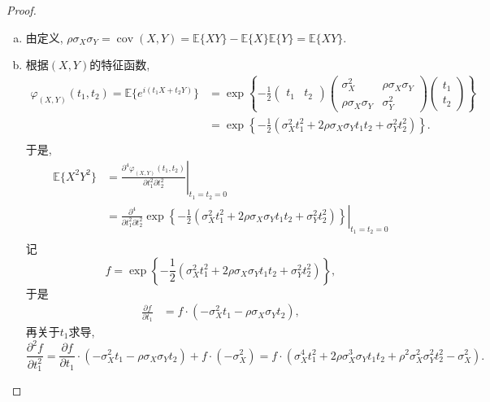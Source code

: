 \documentclass[UTF8, a4paper]{article}
\begin{document}
\begin{proof}
\begin{enumerate}[a)]
    \item 由定义, \(\rho \sigma_X \sigma_Y = \operatorname{cov}(X,Y) = \mathbb{E}\{XY\} - \mathbb{E}\{X\} \mathbb{E}\{Y\} = \mathbb{E}\{XY\}\).
    \item 根据\((X,Y)\)的特征函数, 
    $$
    \begin{aligned}
        \varphi_{(X,Y)}(t_1, t_2) = \mathbb{E}\{e^{i(t_1X + t_2Y)}\} &= \exp\left\{-\frac{1}{2} (\begin{matrix}
            t_1 & t_2
        \end{matrix})
        \left(\begin{matrix}
            \sigma_X^2 & \rho \sigma_X \sigma_Y \\
            \rho \sigma_X \sigma_Y & \sigma_Y^2
        \end{matrix}\right)
        \left(\begin{matrix}
            t_1 \\ t_2
        \end{matrix}\right)
        \right\}    \\
        &= \exp\left\{-\frac{1}{2}\left(\sigma_X^2 t_1^2 + 2\rho \sigma_X \sigma_Y t_1 t_2 + \sigma_Y^2 t_2^2\right)\right\}. \\
    \end{aligned}
    $$
    于是, 
    $$
    \begin{aligned}
        \mathbb{E}\{X^2Y^2\} &= \left.\frac{\partial^4 \varphi_{(X,Y)}(t_1, t_2)}{\partial t_1^2 \partial t_2^2}\right|_{t_1 = t_2 = 0} \\
        &= \left.\frac{\partial^4}{\partial t_1^2 \partial t_2^2}\exp\left\{-\frac{1}{2}\left(\sigma_X^2 t_1^2 + 2\rho \sigma_X \sigma_Y t_1 t_2 + \sigma_Y^2 t_2^2\right)\right\}\right|_{t_1 = t_2 = 0} \\
    \end{aligned}
    $$
    记
    $$
f = \exp\left\{-\frac{1}{2}\left(\sigma_X^2 t_1^2 + 2\rho \sigma_X \sigma_Y t_1 t_2 + \sigma_Y^2 t_2^2\right)\right\},
    $$
    于是
    $$
    \begin{aligned}
        \frac{\partial f}{\partial t_1} &= f \cdot \left(-\sigma_X^2 t_1 - \rho \sigma_X \sigma_Y t_2\right), 
    \end{aligned}
    $$
再关于\(t_1\)求导,
$$
\frac{\partial^2 f}{\partial t_1^2} = \frac{\partial f}{\partial t_1} \cdot \left(-\sigma_X^2 t_1 - \rho \sigma_X \sigma_Y t_2\right) + f \cdot \left(-\sigma_X^2 \right) = f \cdot \left(\sigma_X^4 t_1^2 + 2\rho \sigma_X^3 \sigma_Y t_1 t_2 + \rho^2 \sigma_X^2 \sigma_Y^2 t_2^2 - \sigma_X^2\right).
$$
\end{enumerate}
\end{proof}
\end{document}
